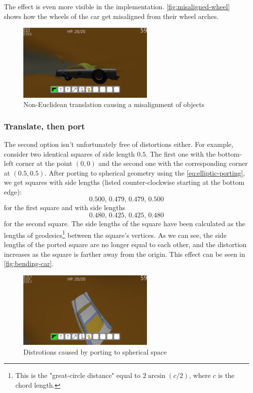 The effect is even more visible in the implementation. \autoref{fig:misaligned-wheel} shows how the wheels of the car get misaligned from their wheel arches.
\begin{figure}[h]
    \centering
    \includegraphics[width=0.6\textwidth]{chapters/theoretical_foundations/sections/non-eudlidean-spaces/resources/misaligned-wheel.png}
    \caption{Non-Euclidean translation causing a misalignment of objects}
    \label{fig:misaligned-wheel}
\end{figure}

\subsubsection*{Translate, then port}
The second option isn't unfortunately free of distortions either.
For example, consider two identical squares of side length $0.5$.
The first one with the bottom-left corner at the point $(0,0)$ and the second one with the corresponding corner at $(0.5, 0.5)$.
After porting to spherical geometry using the \autoref{eq:elliptic-porting}, we get squares with side lengths (listed counter-clockwise starting at the bottom edge):
\begin{equation*}
    0.500, \,
    0.479, \,
    0.479, \,
    0.500
\end{equation*}
for the first square and with side lengths
\begin{equation*}
    0.480, \,
    0.425, \,
    0.425, \,
    0.480
\end{equation*}
for the second square.
The side lengths of the square have been calculated as the lengths of geodesics\footnote{This is the "great-circle distance" equal to $2 \arcsin{(c / 2)}$, where $c$ is the chord length.} between the square's vertices.
As we can see, the side lengths of the ported square are no longer equal to each other, and the distortion increases as the square is farther away from the origin.
This effect can be seen in \autoref{fig:bending-car}.
\begin{figure}[h]
    \centering
    \includegraphics[width=0.6\textwidth]{chapters/theoretical_foundations/sections/non-eudlidean-spaces/resources/bending-car.png}
    \caption{Distrotions caused by porting to spherical space}
    \label{fig:bending-car}
\end{figure}

